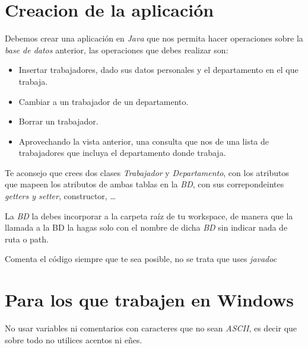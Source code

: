 \documentclass[4paper]{article}
\begin{document}
\section*{Creacion de la aplicación}
Debemos crear una aplicación en \emph{Java} que nos permita hacer operaciones sobre la \emph{base de datos} anterior, las operaciones que debes realizar son:
\begin{itemize}
\item Insertar trabajadores, dado sus datos personales y el departamento en el que trabaja.
\item Cambiar a un trabajador de un departamento.
\item Borrar un trabajador.
\item Aprovechando la vista anterior, una consulta que nos de una lista de trabajadores que incluya el departamento donde trabaja.
\end{itemize}
Te aconsejo que crees dos clases \emph{Trabajador} y \emph{Departamento}, con los atributos que mapeen los atributos de ambas tablas en la \emph{BD}, con sus correpondeintes \emph{getters y setter}, constructor, \dots \par 
La \emph{BD} la debes incorporar a la carpeta raíz de tu workspace, de manera que la llamada a la BD la hagas solo con el nombre de dicha \emph{BD} sin indicar nada de ruta o path.
\par 
Comenta el código siempre que te sea posible, no se trata que uses \emph{javadoc}

\section*{Para los que trabajen en Windows}
No usar variables ni comentarios con caracteres que no sean \emph{ASCII}, es decir que sobre todo no utilices acentos ni eñes.
\end{document}

